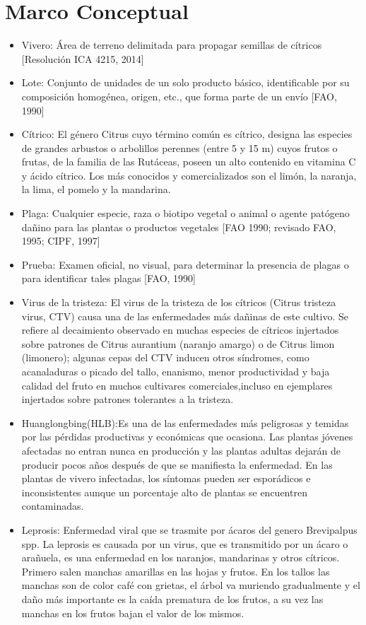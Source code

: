 \section{Marco Conceptual}
\begin{itemize}
\item Vivero: \'{A}rea de terreno delimitada para propagar semillas de c\'{i}tricos [Resoluci\'{o}n ICA 4215, 2014]
\item Lote: Conjunto de unidades de un solo producto b\'{a}sico, identificable por su composici\'{o}n homog\'{e}nea, origen, etc., que forma parte de un env\'{i}o [FAO, 1990] 
\item C\'{i}trico: El g\'{e}nero Citrus cuyo t\'{e}rmino com\'{u}n es c\'{i}trico, designa las especies de grandes arbustos o arbolillos perennes (entre 5 y 15 m) cuyos frutos o frutas, de la familia de las Rut\'{a}ceas, poseen un alto contenido en vitamina C y \'{a}cido c\'{i}trico. Los m\'{a}s conocidos y comercializados son el lim\'{o}n, la naranja, la lima, el pomelo y la mandarina.
\item Plaga: Cualquier especie, raza o biotipo vegetal o animal o agente pat\'{o}geno da\~{n}ino para las plantas o productos vegetales [FAO 1990; revisado FAO, 1995; CIPF, 1997] 
\item Prueba: Examen oficial, no visual, para determinar la presencia de plagas o para identificar tales plagas [FAO, 1990] 
\item Virus de la tristeza: El virus de la tristeza de los c\'{i}tricos (Citrus tristeza virus, CTV) causa una de las enfermedades m\'{a}s
da\~{n}inas de este cultivo. Se refiere al decaimiento observado en muchas especies de c\'{i}tricos injertados sobre patrones de Citrus aurantium (naranjo amargo) o de Citrus limon (limonero); algunas cepas del CTV inducen otros s\'{i}ndromes, como acanaladuras o picado del tallo, enanismo, menor productividad y baja calidad del fruto en muchos cultivares comerciales,incluso en ejemplares injertados sobre patrones tolerantes a la tristeza.\cite{CTV}
\item Huanglongbing(HLB):Es una de las enfermedades m\'{a}s peligrosas y temidas por las p\'{e}rdidas productivas y econ\'{o}micas que ocasiona. Las plantas j\'{o}venes afectadas no entran nunca en producci\'{o}n y las plantas adultas dejar\'{a}n de producir pocos a\~{n}os despu\'{e}s de que se manifiesta la enfermedad. En las plantas de vivero infectadas, los s\'{i}ntomas pueden ser espor\'{a}dicos e inconsistentes aunque un porcentaje alto de plantas se encuentren contaminadas.\cite{HLB}
\item Leprosis: Enfermedad viral que se trasmite por \'{a}caros del genero Brevipalpus spp. La leprosis es causada por un virus, que es transmitido por un \'{a}caro o ara\~{n}uela, es una enfermedad en los naranjos, mandarinas y otros c\'{i}tricos. Primero salen manchas amarillas en las hojas y frutos. En los tallos las manchas son de color caf\'{e} con grietas, el \'{a}rbol va muriendo gradualmente y el da\~{n}o m\'{a}s importante es la ca\'{i}da prematura de los frutos, a su vez las manchas en los frutos bajan el valor de los mismos.\cite{LEP}

\end{itemize}
